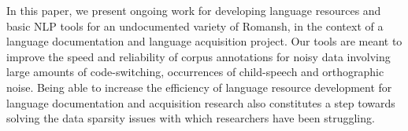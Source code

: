 In this paper, we present ongoing work for developing language resources and basic NLP tools for an undocumented variety of Romansh, in the context of a language documentation and language acquisition project. Our tools are meant to improve the speed and reliability of corpus annotations for noisy data involving large amounts of code-switching, occurrences of child-speech and orthographic noise. Being able to increase the efficiency of language resource development for language documentation and acquisition research also constitutes a step towards solving the data sparsity issues with which researchers have been struggling.
